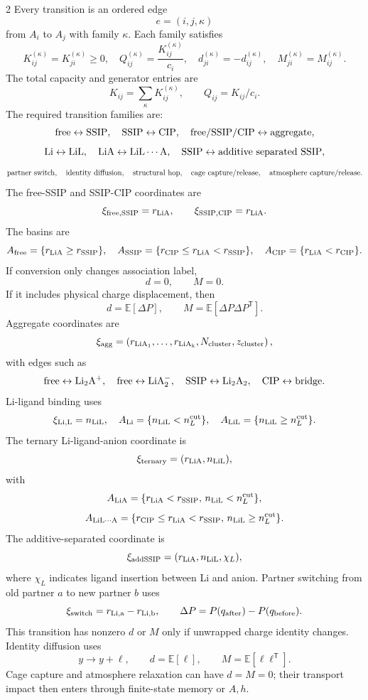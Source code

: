 \documentclass[10pt]{article}
\newcommand{\T}{\mathsf{T}}
\begin{document}
\begin{multicols}{2}
Every transition is an ordered edge
\[
e=(i,j,\kappa)
\]
from \(A_i\) to \(A_j\) with family \(\kappa\). Each family satisfies
\[
K_{ij}^{(\kappa)}=K_{ji}^{(\kappa)}\ge0,
\quad
Q_{ij}^{(\kappa)}=\frac{K_{ij}^{(\kappa)}}{c_i},
\quad
d_{ji}^{(\kappa)}=-d_{ij}^{(\kappa)},
\quad
M_{ji}^{(\kappa)}=M_{ij}^{(\kappa)}.
\]
The total capacity and generator entries are
\[
K_{ij}=\sum_\kappa K_{ij}^{(\kappa)},
\qquad
Q_{ij}=K_{ij}/c_i.
\]
The required transition families are:
\[
{\rm free}\leftrightarrow{\rm SSIP},\quad
{\rm SSIP}\leftrightarrow{\rm CIP},\quad
{\rm free/SSIP/CIP}\leftrightarrow{\rm aggregate},
\]
\[
{\rm Li}\leftrightarrow{\rm LiL},\quad
{\rm LiA}\leftrightarrow{\rm LiL\cdots A},\quad
{\rm SSIP}\leftrightarrow{\rm additive\ separated\ SSIP},
\]
\[
{\rm partner\ switch},\quad
{\rm identity\ diffusion},\quad
{\rm structural\ hop},\quad
{\rm cage\ capture/release},\quad
{\rm atmosphere\ capture/release}.
\]
The free-SSIP and SSIP-CIP coordinates are
\[
\xi_{\rm free,SSIP}=r_{\rm LiA},
\qquad
\xi_{\rm SSIP,CIP}=r_{\rm LiA}.
\]
The basins are
\[
A_{\rm free}=\{r_{\rm LiA}\ge r_{\rm SSIP}\},
\quad
A_{\rm SSIP}=\{r_{\rm CIP}\le r_{\rm LiA}<r_{\rm SSIP}\},
\quad
A_{\rm CIP}=\{r_{\rm LiA}<r_{\rm CIP}\}.
\]
If conversion only changes association label,
\[
d=0,\qquad M=0.
\]
If it includes physical charge displacement, then
\[
d=\mathbb E[\Delta P],
\qquad
M=\mathbb E[\Delta P\Delta P^\T].
\]
Aggregate coordinates are
\[
\xi_{\rm agg}=
\left(
r_{\rm LiA_1},\ldots,r_{\rm LiA_k},
N_{\rm cluster},z_{\rm cluster}
\right),
\]
with edges such as
\[
{\rm free}\leftrightarrow{\rm Li_2A^+},
\quad
{\rm free}\leftrightarrow{\rm LiA_2^-},
\quad
{\rm SSIP}\leftrightarrow{\rm Li_2A_2},
\quad
{\rm CIP}\leftrightarrow{\rm bridge}.
\]
Li-ligand binding uses
\[
\xi_{\rm Li,L}=n_{\rm LiL},
\quad
A_{\rm Li}=\{n_{\rm LiL}<n_L^{\rm cut}\},
\quad
A_{\rm LiL}=\{n_{\rm LiL}\ge n_L^{\rm cut}\}.
\]
The ternary Li-ligand-anion coordinate is
\[
\xi_{\rm ternary}=(r_{\rm LiA},n_{\rm LiL}),
\]
with
\[
A_{\rm LiA}
=
\{r_{\rm LiA}<r_{\rm SSIP},\,n_{\rm LiL}<n_L^{\rm cut}\},
\]
\[
A_{\rm LiL\cdots A}
=
\{r_{\rm CIP}\le r_{\rm LiA}<r_{\rm SSIP},\,
n_{\rm LiL}\ge n_L^{\rm cut}\}.
\]
The additive-separated coordinate is
\[
\xi_{\rm addSSIP}=(r_{\rm LiA},n_{\rm LiL},\chi_L),
\]
where \(\chi_L\) indicates ligand insertion between Li and anion. Partner
switching from old partner \(a\) to new partner \(b\) uses
\[
\xi_{\rm switch}=r_{\rm Li,a}-r_{\rm Li,b},
\qquad
\Delta P=P(q_{\rm after})-P(q_{\rm before}).
\]
This transition has nonzero \(d\) or \(M\) only if unwrapped charge identity
changes. Identity diffusion uses
\[
y\to y+\ell,
\qquad
d=\mathbb E[\ell],
\qquad
M=\mathbb E[\ell\ell^\T].
\]
Cage capture and atmosphere relaxation can have \(d=M=0\); their transport
impact then enters through finite-state memory or \(A,h\).


\end{multicols}
\end{document}
